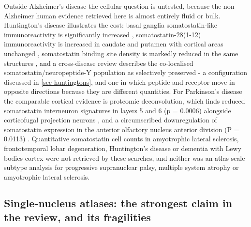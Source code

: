 \documentclass[11pt]{article}
\begin{document}
Outside Alzheimer's disease the cellular question is untested, because the non-Alzheimer human evidence retrieved here is almost entirely fluid or bulk. Huntington's disease illustrates the cost: basal ganglia somatostatin-like immunoreactivity is significantly increased \citep{Dawbarn1985}, somatostatin-28(1-12) immunoreactivity is increased in caudate and putamen with cortical areas unchanged \citep{Beal1985a}, somatostatin binding site density is markedly reduced in the same structures \citep{Palacios1990}, and a cross-disease review describes the co-localised somatostatin/neuropeptide-Y population as selectively preserved \citep{Beal1986b} - a configuration discussed in \ref{sec-huntingtons}, and one in which peptide and receptor move in opposite directions because they are different quantities. For Parkinson's disease the comparable cortical evidence is proteomic deconvolution, which finds reduced somatostatin interneuron signatures in layers 5 and 6 (p = 0.0006) alongside corticofugal projection neurons \citep{Dick2024}, and a circumscribed downregulation of somatostatin expression in the anterior olfactory nucleus anterior division (P = 0.0113) \citep{UbedaBanon2017}. Quantitative somatostatin cell counts in amyotrophic lateral sclerosis, frontotemporal lobar degeneration, Huntington's disease or dementia with Lewy bodies cortex were not retrieved by these searches, and neither was an atlas-scale subtype analysis for progressive supranuclear palsy, multiple system atrophy or amyotrophic lateral sclerosis.

\subsection{Single-nucleus atlases: the strongest claim in the review, and its fragilities}
\label{sec-09-single-nucleus}
\end{document}
